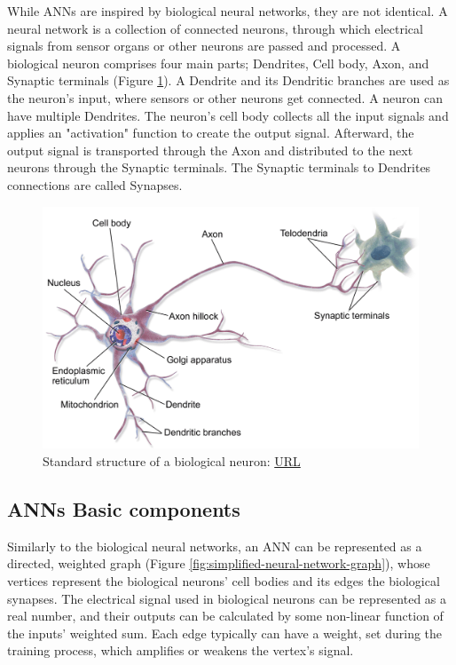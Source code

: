 While ANNs are inspired by biological neural networks, they are not identical. A neural network is a collection of connected neurons, through which electrical signals from sensor organs or other neurons are passed and processed. A biological neuron comprises four main parts; Dendrites, Cell body, Axon, and Synaptic terminals (Figure \ref{fig:Standard-structure-of-a-biological-neuron}). A Dendrite and its Dendritic branches are used as the neuron's input, where sensors or other neurons get connected. A neuron can have multiple Dendrites. The neuron's cell body collects all the input signals and applies an "activation" function to create the output signal. Afterward, the output signal is transported through the Axon and distributed to the next neurons through the Synaptic terminals. The Synaptic terminals to Dendrites connections are called Synapses.

\begin{figure} [H]
	\centering
	\includegraphics[scale=0.25]{../Images/CNNArchitectures/Biological-Neuron.png}
	\decoRule
	\caption[Standard structure of a biological neuron]{Standard structure of a biological neuron: \href{https://nurseslabs.com/nervous-system/}{URL}}
	\label{fig:Standard-structure-of-a-biological-neuron}
\end{figure}

\subsection{ANNs Basic components} \label{subsection:ANNs-Basic-components}
Similarly to the biological neural networks, an ANN can be represented as a directed, weighted graph (Figure \ref{fig:simplified-neural-network-graph}), whose vertices represent the biological neurons' cell bodies and its edges the biological synapses. The electrical signal used in biological neurons can be represented as a real number, and their outputs can be calculated by some non-linear function of the inputs' weighted sum. Each edge typically can have a weight, set during the training process, which amplifies or weakens the vertex's signal.

